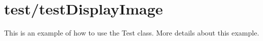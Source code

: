 \hypertarget{test_2test_display_image-example}{
\section{test/test\-Display\-Image}
}
\-This is an example of how to use the \-Test class. \-More details about this example.


\begin{DoxyCodeInclude}
\end{DoxyCodeInclude}
 